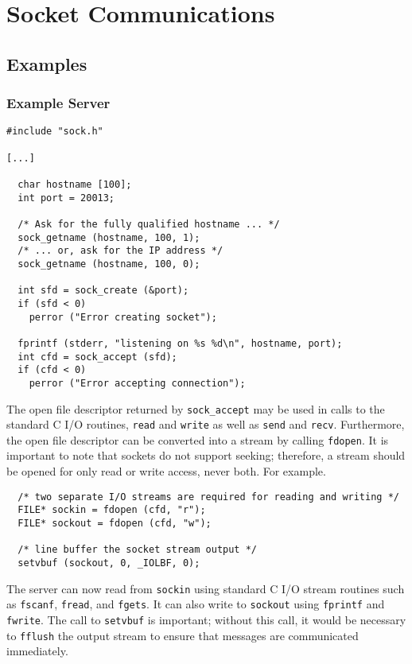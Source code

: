 \chapter{Socket Communications}

\section{Examples}
\subsection{Example Server}

\begin{verbatim}
#include "sock.h"

[...]

  char hostname [100];
  int port = 20013;

  /* Ask for the fully qualified hostname ... */
  sock_getname (hostname, 100, 1);
  /* ... or, ask for the IP address */
  sock_getname (hostname, 100, 0);

  int sfd = sock_create (&port);
  if (sfd < 0)
    perror ("Error creating socket");

  fprintf (stderr, "listening on %s %d\n", hostname, port);
  int cfd = sock_accept (sfd);
  if (cfd < 0)
    perror ("Error accepting connection");
\end{verbatim}
The open file descriptor returned by {\tt sock\_accept} may be used in
calls to the standard C I/O routines, {\tt read} and {\tt write} as
well as {\tt send} and {\tt recv}.  Furthermore, the open file
descriptor can be converted into a stream by calling {\tt fdopen}.  It
is important to note that sockets do not support seeking; therefore, a
stream should be opened for only read or write access, never both.
For example.
\begin{verbatim}
  /* two separate I/O streams are required for reading and writing */
  FILE* sockin = fdopen (cfd, "r");
  FILE* sockout = fdopen (cfd, "w");

  /* line buffer the socket stream output */
  setvbuf (sockout, 0, _IOLBF, 0);
\end{verbatim}
The server can now read from {\tt sockin} using standard C I/O stream
routines such as {\tt fscanf}, {\tt fread}, and {\tt fgets}.  It can
also write to {\tt sockout} using {\tt fprintf} and {\tt fwrite}.
The call to {\tt setvbuf} is important; without this call, it would
be necessary to {\tt fflush} the output stream to ensure that messages
are communicated immediately.

